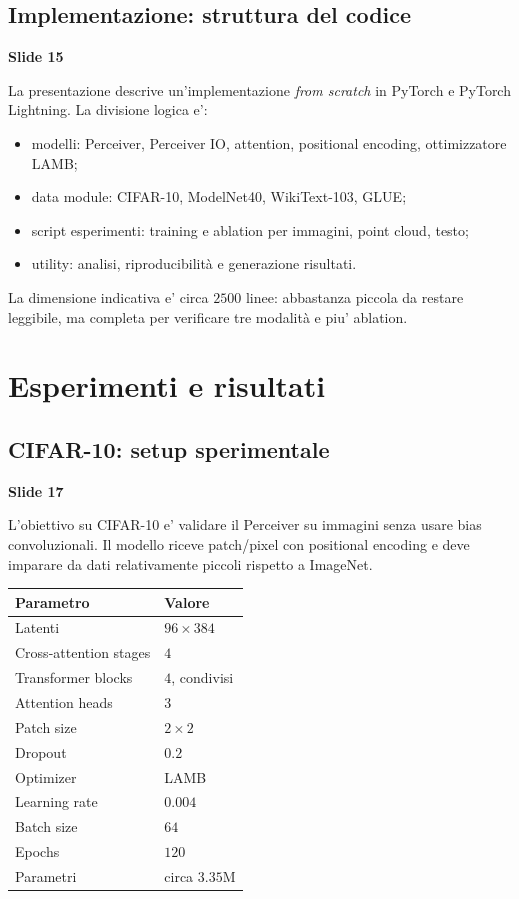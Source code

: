 \documentclass[11pt,a4paper]{article}
\newcommand{\slide}[1]{\textcolor{mainblue}{\textbf{Slide #1}}}
\begin{document}
\subsection{Implementazione: struttura del codice}
\slide{15}

La presentazione descrive un'implementazione \emph{from scratch} in PyTorch e
PyTorch Lightning. La divisione logica e':
\begin{itemize}
  \item modelli: Perceiver, Perceiver IO, attention, positional encoding,
  ottimizzatore LAMB;
  \item data module: CIFAR-10, ModelNet40, WikiText-103, GLUE;
  \item script esperimenti: training e ablation per immagini, point cloud,
  testo;
  \item utility: analisi, riproducibilit\`a e generazione risultati.
\end{itemize}

La dimensione indicativa e' circa $2500$ linee: abbastanza piccola da restare
leggibile, ma completa per verificare tre modalit\`a e piu' ablation.

\section{Esperimenti e risultati}

\subsection{CIFAR-10: setup sperimentale}
\slide{17}

L'obiettivo su CIFAR-10 e' validare il Perceiver su immagini senza usare bias
convoluzionali. Il modello riceve patch/pixel con positional encoding e deve
imparare da dati relativamente piccoli rispetto a ImageNet.

\begin{center}
\begin{tabular}{ll}
\toprule
\textbf{Parametro} & \textbf{Valore} \\
\midrule
Latenti & $96 \times 384$ \\
Cross-attention stages & $4$ \\
Transformer blocks & $4$, condivisi \\
Attention heads & $3$ \\
Patch size & $2 \times 2$ \\
Dropout & $0.2$ \\
Optimizer & LAMB \\
Learning rate & $0.004$ \\
Batch size & $64$ \\
Epochs & $120$ \\
Parametri & circa $3.35$M \\
\bottomrule
\end{tabular}
\end{center}
\end{document}
